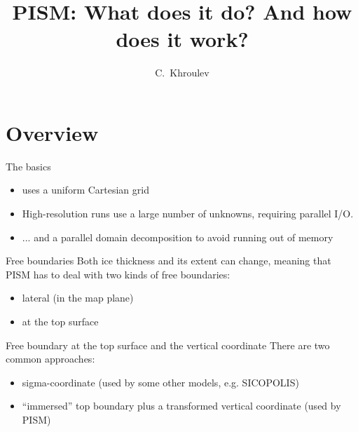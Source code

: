 \documentclass[hide notes,intlimits]{beamer}
\title{PISM: What does it do? And how does it work?}
\author{C.~Khroulev}
\date{}
\begin{document}
\begin{frame}
  \titlepage
\end{frame}


\section{Overview}
\label{sec:overview}

\begin{frame}{The basics}
  \begin{itemize}
  \item uses a uniform Cartesian grid
  \item High-resolution runs use a large number of unknowns, requiring
    parallel I/O.
  \item ... and a parallel domain decomposition to avoid running out
    of memory
  \end{itemize}
\end{frame}


\begin{frame}{Free boundaries}
  Both ice thickness and its extent can change, meaning that PISM has
  to deal with two kinds of free boundaries:

  \begin{itemize}
  \item lateral (in the map plane)
  \item at the top surface
  \end{itemize}
\end{frame}


\begin{frame}{Free boundary at the top surface and the vertical coordinate}
  There are two common approaches:
  \begin{itemize}
  \item sigma-coordinate (used by some other models, e.g. SICOPOLIS)
  \item ``immersed'' top boundary plus a transformed
    vertical coordinate (used by PISM)
  \end{itemize}
\end{frame}
\end{document}

